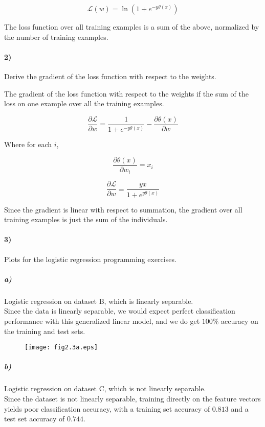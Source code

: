 \documentclass[10pt,letter]{article}
\begin{document}
\[ \mathcal{L}(w) = \ln(1 + e^{-y\theta(x)}) \]

The loss function over all training examples is a sum of the above, normalized by the number of 
training examples.

\paragraph{2)} Derive the gradient of the loss function with respect to the weights.

The gradient of the loss function with respect to the weights if the sum of the loss on one example 
over all the training examples.

\[ \frac{\partial \mathcal{L}}{\partial w} = \frac{1}{1 + e^{-y\theta(x)}} -\frac{\partial \theta(x)}
{\partial w} \]

Where for each $i$,

\[ \frac{\partial\theta(x)}{\partial w_i} = x_i \]

\[ \frac{\partial \mathcal{L}}{\partial w} = \frac{yx}{1 + e^{y\theta(x)}} \]

Since the gradient is linear with respect to summation, the gradient over all training examples is just the sum of the individuals.

\paragraph{3)} Plots for the logistic regression programming exercises.

\subparagraph{a)} Logistic regression on dataset B, which is linearly separable.\\

Since the data is linearly separable, we would expect perfect classification performance with 
this generalized linear model, and we do get $100\%$ accuracy on the training and test sets.

\begin{figure}[b]
\vspace*{-2cm}
\centering
\texttt{[image: fig2.3a.eps]}
\end{figure}

\subparagraph{b)} Logistic regression on dataset C, which is not linearly separable.\\

Since the dataset is not linearly separable, training directly on the feature vectors yields poor 
classification accuracy, with a training set accuracy of $0.813$ and a test set accuracy of $0.744$.
\end{document}

